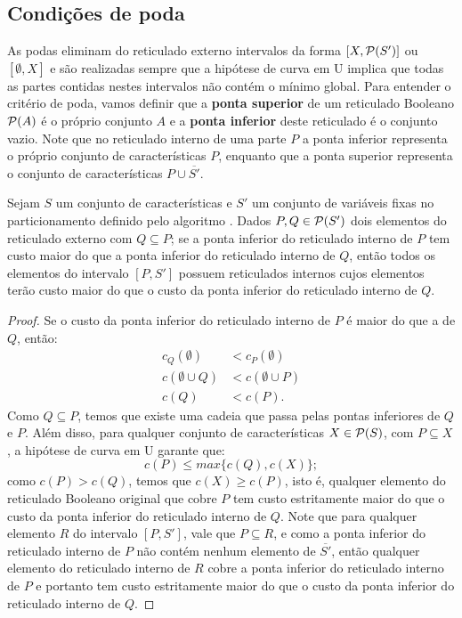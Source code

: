 \subsection{Condições de poda}
As podas eliminam do reticulado externo intervalos da forma 
$[X, \mathcal{P}(S')]$ ou $[\emptyset, X]$ e são realizadas sempre que a 
hipótese de curva em U implica que todas as partes contidas nestes 
intervalos não contém o mínimo global. Para entender o critério de poda,
vamos definir que a {\bf ponta superior} de um reticulado Booleano 
$\mathcal{P} (A)$ é o próprio conjunto $A$ e a {\bf ponta inferior} deste
reticulado é o conjunto vazio. Note que no reticulado interno de uma
parte $P$ a ponta inferior representa o próprio conjunto de 
características $P$, enquanto que a ponta superior representa o conjunto
de características $P \cup \overline{S'}$.

\begin{mytheorem}
\label{theorem:pucs:pruning}
Sejam $S$ um conjunto de características e $S'$ um conjunto de variáveis
fixas no particionamento definido pelo algoritmo . Dados
$P, Q \in \mathcal{P} (S')$ dois elementos do reticulado externo com 
$Q \subseteq P$; se a ponta inferior do reticulado interno de $P$ tem 
custo maior do que a ponta inferior do reticulado interno de $Q$, então 
todos os elementos do intervalo $[P, S']$ possuem reticulados internos cujos elementos terão custo maior do que o custo da ponta inferior do reticulado interno de $Q$.
\end{mytheorem}
\begin{proof}
Se o custo da ponta inferior do reticulado interno de $P$ é maior do que
a de $Q$, então:
\begin{subequations}
\begin{align}
    c_Q (\emptyset) & < c_P (\emptyset) \nonumber \\
    c (\emptyset \cup Q) & < c (\emptyset \cup P) \nonumber \\
    c (Q) & < c (P). \nonumber
\end{align}
\end{subequations}
Como $Q \subseteq P$, temos que existe uma cadeia que passa pelas pontas
inferiores de $Q$ e $P$. Além disso, para qualquer conjunto de 
características $X \in \mathcal{P} (S)$, com $P \subseteq X$, a hipótese 
de curva em U garante que:
\begin{equation}
    c (P) \leq max \{c (Q), c (X)\}; \nonumber
\end{equation}
como $c (P) > c (Q)$, temos que $c (X) \geq c (P)$, isto é, qualquer 
elemento do reticulado Booleano original que cobre $P$ tem custo estritamente maior do que o custo da ponta inferior do reticulado interno de $Q$.
Note que para qualquer elemento $R$ do intervalo $[P, S']$, 
vale que $P \subseteq R$, e como a ponta inferior do reticulado interno de $P$ não contém 
nenhum elemento de $\overline {S'}$, então qualquer elemento do reticulado interno de $R$ cobre a ponta inferior do reticulado interno de $P$ e portanto tem custo estritamente maior do que o custo da ponta inferior do reticulado interno de $Q$.
\end{proof}

